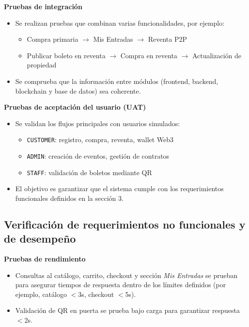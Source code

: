 \documentclass[12pt,letterpaper]{article}
\begin{document}
\textbf{Pruebas de integración}  
\begin{itemize}
    \item Se realizan pruebas que combinan varias funcionalidades, por ejemplo:
    \begin{itemize}
        \item Compra primaria $\rightarrow$ Mis Entradas $\rightarrow$ Reventa P2P
        \item Publicar boleto en reventa $\rightarrow$ Compra en reventa $\rightarrow$
        Actualización de propiedad
    \end{itemize}
    \item Se comprueba que la información entre módulos (frontend, backend, blockchain
    y base de datos) sea coherente.
\end{itemize}

\textbf{Pruebas de aceptación del usuario (UAT)}  
\begin{itemize}
    \item Se validan los flujos principales con usuarios simulados:
    \begin{itemize}
        \item \texttt{CUSTOMER}: registro, compra, reventa, wallet Web3
        \item \texttt{ADMIN}: creación de eventos, gestión de contratos
        \item \texttt{STAFF}: validación de boletos mediante QR
    \end{itemize}
    \item El objetivo es garantizar que el sistema cumple con los requerimientos
    funcionales definidos en la sección 3.
\end{itemize}

\subsection{Verificación de requerimientos no funcionales y de desempeño}

\textbf{Pruebas de rendimiento}  
\begin{itemize}
    \item Consultas al catálogo, carrito, checkout y sección \textit{Mis Entradas} se
    prueban para asegurar tiempos de respuesta dentro de los límites definidos
    (por ejemplo, catálogo $<$3s, checkout $<$5s).
    \item Validación de QR en puerta se prueba bajo carga para garantizar respuesta $<$2s.
\end{itemize}
\end{document}
